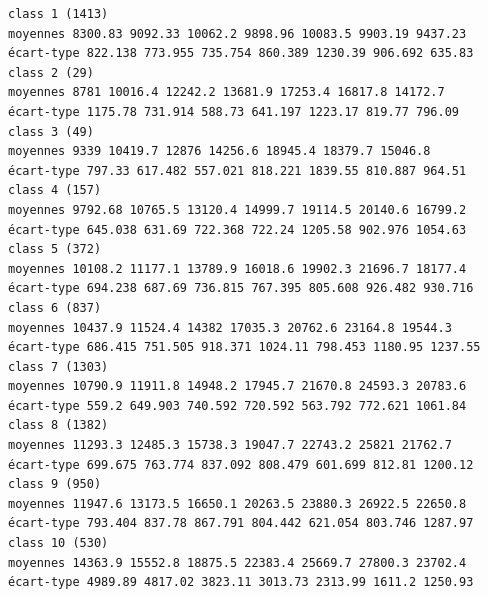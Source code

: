\documentclass[land,article,submit,pdftex,moreauthors]{Definitions/mdpi}
\begin{document}
\begin{scriptsize}
\begin{verbatim}
class 1 (1413)
moyennes 8300.83 9092.33 10062.2 9898.96 10083.5 9903.19 9437.23
écart-type 822.138 773.955 735.754 860.389 1230.39 906.692 635.83
class 2 (29)
moyennes 8781 10016.4 12242.2 13681.9 17253.4 16817.8 14172.7
écart-type 1175.78 731.914 588.73 641.197 1223.17 819.77 796.09
class 3 (49)
moyennes 9339 10419.7 12876 14256.6 18945.4 18379.7 15046.8
écart-type 797.33 617.482 557.021 818.221 1839.55 810.887 964.51
class 4 (157)
moyennes 9792.68 10765.5 13120.4 14999.7 19114.5 20140.6 16799.2
écart-type 645.038 631.69 722.368 722.24 1205.58 902.976 1054.63
class 5 (372)
moyennes 10108.2 11177.1 13789.9 16018.6 19902.3 21696.7 18177.4
écart-type 694.238 687.69 736.815 767.395 805.608 926.482 930.716
class 6 (837)
moyennes 10437.9 11524.4 14382 17035.3 20762.6 23164.8 19544.3
écart-type 686.415 751.505 918.371 1024.11 798.453 1180.95 1237.55
class 7 (1303)
moyennes 10790.9 11911.8 14948.2 17945.7 21670.8 24593.3 20783.6
écart-type 559.2 649.903 740.592 720.592 563.792 772.621 1061.84
class 8 (1382)
moyennes 11293.3 12485.3 15738.3 19047.7 22743.2 25821 21762.7
écart-type 699.675 763.774 837.092 808.479 601.699 812.81 1200.12
class 9 (950)
moyennes 11947.6 13173.5 16650.1 20263.5 23880.3 26922.5 22650.8
écart-type 793.404 837.78 867.791 804.442 621.054 803.746 1287.97
class 10 (530)
moyennes 14363.9 15552.8 18875.5 22383.4 25669.7 27800.3 23702.4
écart-type 4989.89 4817.02 3823.11 3013.73 2313.99 1611.2 1250.93


\end{verbatim}
\end{scriptsize}
\end{document}
